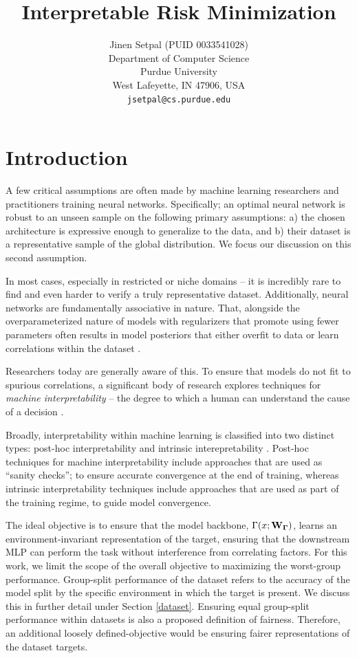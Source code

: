 \documentclass{article} %
\title{Interpretable Risk Minimization}
\author{Jinen Setpal (PUID 0033541028) \\
Department of Computer Science \\
Purdue University \\
West Lafeyette, IN 47906, USA \\
\texttt{jsetpal@cs.purdue.edu}
}
\begin{document}
\maketitle

\section{Introduction}
\label{intro}

A few critical assumptions are often made by machine learning researchers and practitioners training neural networks. Specifically; an optimal neural network is robust to an unseen sample on the following primary assumptions: a) the chosen architecture is expressive enough to generalize to the data, and b) their dataset is a representative sample of the global distribution. We focus our discussion on this second assumption.

In most cases, especially in restricted or niche domains -- it is incredibly rare to find and even harder to verify a truly representative dataset. Additionally, neural networks are fundamentally associative in nature. That, alongside the overparameterized nature of models with regularizers that promote using fewer parameters often results in model posteriors that either overfit to data or learn correlations within the dataset \citep{kanal1964recognition}.

Researchers today are generally aware of this. To ensure that models do not fit to spurious correlations, a significant body of research explores techniques for \textit{machine interpretability} -- the degree to which a human can understand the cause of a decision \citep{molnar2020interpretable}.

Broadly, interpretability within machine learning is classified into two distinct types: post-hoc interpretability \citep{madsen2022post} and intrinsic interepretability \citep{pintelas2020grey, sarkar2022framework, reddy2022causally}. Post-hoc techniques for machine interpretability include approaches that are used as ``sanity checks''; to ensure accurate convergence at the end of training, whereas intrinsic interpretability techniques include approaches that are used as part of the training regime, to guide model convergence.

The ideal objective is to ensure that the model backbone, $\Gamma(x; {\bf W_\Gamma})$, learns an environment-invariant representation of the target, ensuring that the downstream MLP can perform the task without interference from correlating factors. For this work, we limit the scope of the overall objective to maximizing the worst-group performance. Group-split performance of the dataset refers to the accuracy of the model split by the specific environment in which the target is present. We discuss this in further detail under Section \ref{dataset}. Ensuring equal group-split performance within datasets is also a proposed definition of fairness. Therefore, an additional loosely defined-objective would be ensuring fairer representations of the dataset targets.
\end{document}
